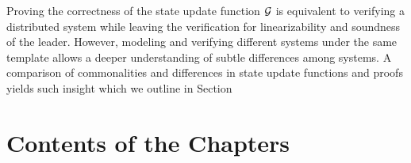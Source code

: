 Proving the correctness of the state update function $\mathcal{G}$ is equivalent to
verifying a distributed system while leaving the verification for linearizability
and soundness of the leader. However, modeling and verifying different systems
under the same template allows a deeper understanding of subtle differences among systems.
A comparison of commonalities and differences in state update functions
and proofs yields such insight which we outline in Section



\section{Contents of the Chapters}
\label{chapter:introduction:sec:contents-of-the-chapters}




%
%
%
%
%
